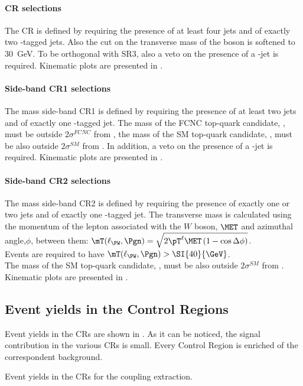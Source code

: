 \paragraph{\ttZ CR selections}
\label{sec:bkg:ttz}
The \ttZ CR is defined by requiring the presence of at least four jets
and of exactly two \Pqb-tagged jets. Also the cut on the transverse
mass of the \PW boson is softened to \SI{30}{\GeV}. To be orthogonal 
with SR3\tZc, also a veto on the presence of a \Pqc-jet is required. 
Kinematic plots are presented in .

\paragraph{Side-band CR1 selections}
\label{sec:bkg:sbcr1tzu}
The mass side-band CR1 is defined by requiring the presence of at least two jets
and of exactly one \Pqb-tagged jet.
The mass of the FCNC top-quark candidate, \mtopfcnc,
must be outside $2\sigma^{FCNC}$ from \mtopvalue, the mass of the
SM top-quark candidate, \mtopsm, must be also outside $2\sigma^{SM}$
from \mtopvalue.  In addition, a veto on the presence of a \Pqc-jet is required. 
Kinematic plots are presented in .

\paragraph{Side-band CR2 selections}
\label{sec:bkg:sbcr2}
The mass side-band CR2 is defined by requiring the presence of exactly one or two jets
and of exactly one \Pqb-tagged jet.   The transverse mass is calculated using the momentum of the lepton associated with the $W$ boson, $\MET$ and azimuthal angle,$\phi$, between them: 
$\mT(\ell_{\PW},\Pgn) = \sqrt{2\pT^{\ell}\MET \left(1-\cos\Delta\phi\right)}$.\\
Events are required to have $\mT(\ell_{\PW},\Pgn) > \SI{40}{\GeV}$.\\
The mass of the SM top-quark candidate, \mtopsm, must be also outside $2\sigma^{SM}$
from \mtopvalue. Kinematic plots are presented in .

\subsection{Event yields in the Control Regions}
Event yields in the CRs are shown in . 
As it can be noticed, the signal contribution in the various CRs is small.
Every Control Region is enriched of the correspondent background. 
\begin{table}[htbp]
	\footnotesize
	\centering
	
	\caption{Event yields in the CRs for the \tZc coupling extraction. \TabErrStatSys} 
	\label{tab:bkg:yields:tzc}
\end{table} 

